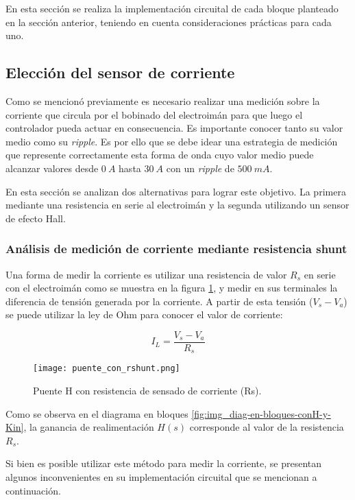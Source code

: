 En esta sección se realiza la implementación circuital de cada bloque planteado en la sección anterior, teniendo en cuenta consideraciones prácticas para cada uno.


\subsection{Elección del sensor de corriente}

Como se mencionó previamente es necesario realizar una medición sobre la corriente que circula por el bobinado del electroimán para que luego el controlador pueda actuar en consecuencia. Es importante conocer tanto su valor medio como su \textsl{ripple}. Es por ello que se debe idear una estrategia de medición que represente correctamente esta forma de onda cuyo valor medio puede alcanzar valores desde $0\:A$ hasta $30\:A$ con un \textsl{ripple} de $500\:mA$.

En esta sección se analizan dos alternativas para lograr este objetivo. La primera mediante una resistencia en serie al electroimán y la segunda utilizando un sensor de efecto Hall.


\subsubsection{Análisis de medición de corriente mediante resistencia shunt}

Una forma de medir la corriente es utilizar una resistencia de valor $R_s$ en serie con el electroimán como se muestra en la figura \ref{fig:img_puente_con_rshunt}, y medir en sus terminales la diferencia de tensión generada por la corriente. A partir de esta tensión ($V_s-V_a$) se puede utilizar la ley de Ohm para conocer el valor de corriente:

\begin{equation}
	I_L=\frac{V_s-V_a}{R_s}
\end{equation}

\begin{figure}[H]
	\centering
	\texttt{[image: puente\_con\_rshunt.png]}
	\caption{Puente H con resistencia de sensado de corriente (Rs).}
	\label{fig:img_puente_con_rshunt}
\end{figure}

Como se observa en el diagrama en bloques \ref{fig:img_diag-en-bloques-conH-y-Kin}, la ganancia de realimentación $H(s)$ corresponde al valor de la resistencia $R_s$.

Si bien es posible utilizar este método para medir la corriente, se presentan algunos inconvenientes en su implementación circuital que se mencionan a continuación.

